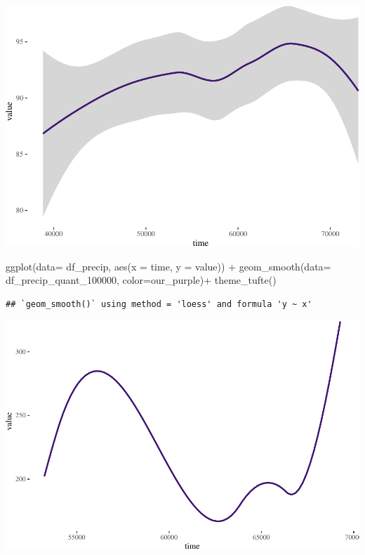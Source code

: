 \documentclass[
  paper=a4,
  ,captions=tableheading
]{scrartcl}
\newenvironment{Shaded}{\begin{snugshade}}{\end{snugshade}}
\newcommand{\AttributeTok}[1]{\textcolor[rgb]{0.77,0.63,0.00}{#1}}
\newcommand{\FunctionTok}[1]{\textcolor[rgb]{0.00,0.00,0.00}{#1}}
\newcommand{\NormalTok}[1]{#1}
\newcommand{\SpecialCharTok}[1]{\textcolor[rgb]{0.00,0.00,0.00}{#1}}
\begin{document}
\includegraphics{Haskell_files/figure-latex/unnamed-chunk-49-8.pdf}

\begin{Shaded}
\begin{Highlighting}[]
\FunctionTok{ggplot}\NormalTok{(}\AttributeTok{data=}\NormalTok{ df\_precip, }\FunctionTok{aes}\NormalTok{(}\AttributeTok{x =}\NormalTok{ time, }\AttributeTok{y =}\NormalTok{ value)) }\SpecialCharTok{+} 
     \FunctionTok{geom\_smooth}\NormalTok{(}\AttributeTok{data=}\NormalTok{ df\_precip\_quant\_100000, }\AttributeTok{color=}\NormalTok{our\_purple)}\SpecialCharTok{+}
  \FunctionTok{theme\_tufte}\NormalTok{()}
\end{Highlighting}
\end{Shaded}

\begin{verbatim}
## `geom_smooth()` using method = 'loess' and formula 'y ~ x'
\end{verbatim}

\includegraphics{Haskell_files/figure-latex/unnamed-chunk-49-9.pdf}
\end{document}
